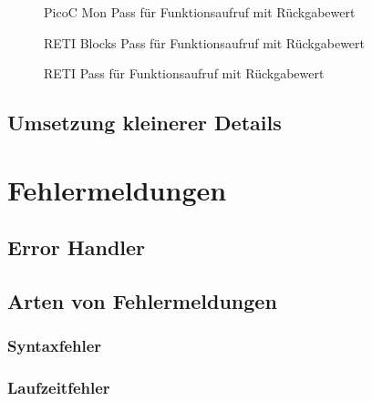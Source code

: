 \begin{figure}[H]
  \centering
  \caption{PicoC Mon Pass für Funktionsaufruf mit Rückgabewert}
  \label{fig:picoc_mon_pass_für_funktionsaufruf_mit_rückgabewert}
\end{figure}

\begin{figure}[H]
  \centering
  \caption{RETI Blocks Pass für Funktionsaufruf mit Rückgabewert}
  \label{fig:reti_blocks_pass_für_funktionsaufruf_mit_rückgabewert}
\end{figure}

\begin{figure}[H]
  \centering
  \caption{RETI Pass für Funktionsaufruf mit Rückgabewert}
  \label{fig:reti_pass_für_funktionsaufruf_mit_rückgabewert}
\end{figure}



\subsection{Umsetzung kleinerer Details}
\section{Fehlermeldungen}
\subsection{Error Handler}
\subsection{Arten von Fehlermeldungen}
\subsubsection{Syntaxfehler}
\subsubsection{Laufzeitfehler}
